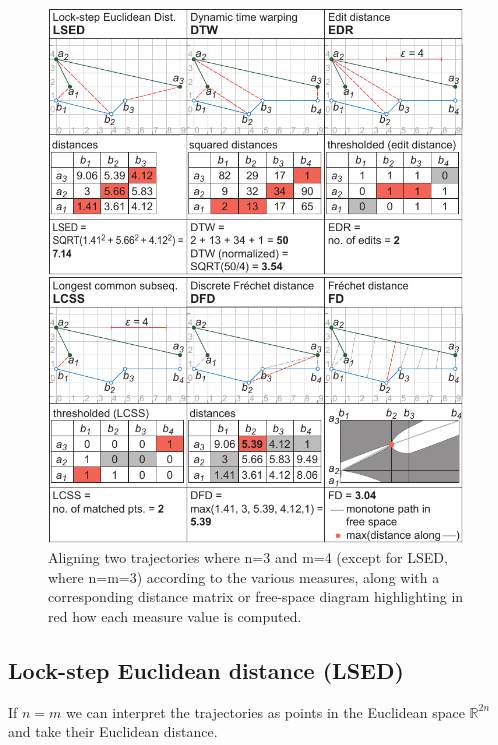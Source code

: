 \documentclass[10pt,letterpaper]{article}
\begin{document}
\begin{figure}[ht]
\centering
\includegraphics[width=110mm]{figures/Fig2}
\caption{Aligning two trajectories where n=3 and m=4 (except for LSED, where n=m=3) according to the various measures, along with a corresponding distance matrix or free-space diagram highlighting in red how each measure value is computed.}\label{fig:Traj_align}
\end{figure}

\subsection{Lock-step Euclidean distance (LSED)}



If  $n=m$ we can interpret the trajectories as points in the Euclidean space $\mathbb{R}^{2n}$ and take their Euclidean distance.
\end{document}
